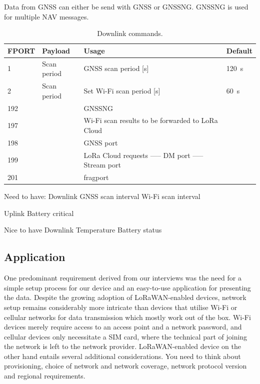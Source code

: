 Data from \ac{GNSS} can either be send with \ac{GNSS} or \ac{GNSSNG}. \ac{GNSSNG} is used for multiple NAV messages.

\begin{table}[H]
\centering
\caption{Downlink commands.}
\label{tab:downlink_commands}
\begin{tabular}{l|l|p{9cm}|l}
\ac{FPORT} & Payload & Usage & Default \\ \hline
1 & Scan period & \ac{GNSS} scan period [s] & \SI{120}{\second} \\
2 & Scan period & Set Wi-Fi scan period [s] & \SI{60}{\second} \\
192 & & \ac{GNSSNG}  & \\
197 & & Wi-Fi scan results to be forwarded to LoRa Cloud & \\
198 & & \ac{GNSS} port  & \\
199 & & LoRa Cloud requests ----- DM port ----- Stream port  & \\
201 & & fragport  & \\
\end{tabular}
\end{table}

Need to have:
Downlink
\ac{GNSS} scan interval
Wi-Fi scan interval

Uplink
Battery critical

Nice to have
Downlink
Temperature
Battery status

\subsection{Application}
One predominant requirement derived from our interviews was the need for a simple setup process for our device and an easy-to-use application for presenting the data.
Despite the growing adoption of \ac{LoRaWAN}-enabled devices, network setup remains considerably more intricate than devices that utilise Wi-Fi or cellular networks for data transmission which mostly work out of the box. Wi-Fi devices merely require access to an access point and a network password, and cellular devices only necessitate a SIM card, where the technical part of joining the network is left to the network provider. \ac{LoRaWAN}-enabled device on the other hand entails several additional considerations. You need to think about provisioning, choice of network and network coverage, network protocol version and regional requirements.

